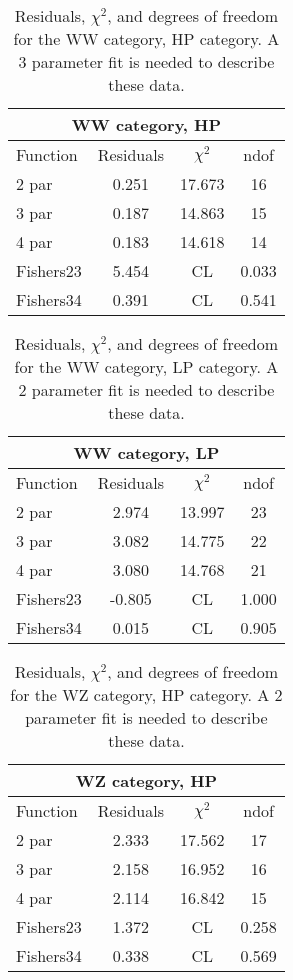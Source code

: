 \begin{table}[htb]
\centering
\begin{tabular}{|l c c c |}
\hline
\multicolumn{4}{|c|}{WW category, HP}\\
\hline
Function & Residuals & $\chi^2$ & ndof \\
\hline
2 par & 0.251 & 17.673 & 16 \\
3 par & 0.187 & 14.863 & 15 \\
4 par & 0.183 & 14.618 & 14 \\
\hline
\hline
Fishers23  & 5.454 & CL & 0.033\\
Fishers34  & 0.391 & CL & 0.541\\
\hline
\end{tabular}
\caption{Residuals, $\chi^{2}$, and degrees of freedom for the WW category, HP category. A 3 parameter fit is needed to describe these data.}
\label{tab:WW category, HP}
\end{table}
\begin{table}[htb]
\centering
\begin{tabular}{|l c c c |}
\hline
\multicolumn{4}{|c|}{WW category, LP}\\
\hline
Function & Residuals & $\chi^2$ & ndof \\
\hline
2 par & 2.974 & 13.997 & 23 \\
3 par & 3.082 & 14.775 & 22 \\
4 par & 3.080 & 14.768 & 21 \\
\hline
\hline
Fishers23  & -0.805 & CL & 1.000\\
Fishers34  & 0.015 & CL & 0.905\\
\hline
\end{tabular}
\caption{Residuals, $\chi^{2}$, and degrees of freedom for the WW category, LP category. A 2 parameter fit is needed to describe these data.}
\label{tab:WW category, LP}
\end{table}
\begin{table}[htb]
\centering
\begin{tabular}{|l c c c |}
\hline
\multicolumn{4}{|c|}{WZ category, HP}\\
\hline
Function & Residuals & $\chi^2$ & ndof \\
\hline
2 par & 2.333 & 17.562 & 17 \\
3 par & 2.158 & 16.952 & 16 \\
4 par & 2.114 & 16.842 & 15 \\
\hline
\hline
Fishers23  & 1.372 & CL & 0.258\\
Fishers34  & 0.338 & CL & 0.569\\
\hline
\end{tabular}
\caption{Residuals, $\chi^{2}$, and degrees of freedom for the WZ category, HP category. A 2 parameter fit is needed to describe these data.}
\label{tab:WZ category, HP}
\end{table}
